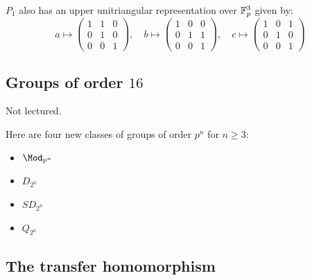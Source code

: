 \documentclass{article}
\begin{document}
$P_1$ also has an upper unitriangular representation over $\mathbb{F}_p^3$ given by: \[
a \mapsto \begin{pmatrix}
    1 & 1 & 0 \\
    0 & 1 & 0 \\
    0 & 0 & 1
\end{pmatrix}, \quad
b \mapsto \begin{pmatrix}
    1 & 0 & 0 \\
    0 & 1 & 1 \\
    0 & 0 & 1
\end{pmatrix}, \quad
c \mapsto \begin{pmatrix}
    1 & 0 & 1 \\
    0 & 1 & 0 \\
    0 & 0 & 1
\end{pmatrix}
\]

\subsection{Groups of order $16$}

Not lectured.

\begin{definition}
    Here are four new classes of groups of order $p^n$ for $n\geq 3$: \begin{itemize}
        \item $\Mod_{p^n}$
        \item $D_{2^n}$
        \item $SD_{2^n}$
        \item $Q_{2^n}$
    \end{itemize}
\end{definition}

\subsection{The transfer homomorphism}
\end{document}
